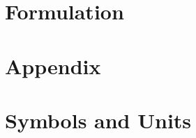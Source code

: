 \documentclass[fleqn,10pt]{SelfArx} %
\begin{document}
\flushbottom    %
\maketitle      %
\tableofcontents

\thispagestyle{empty} %

\section{Formulation}


\section{Appendix}


\section{Symbols and Units}




\end{document}
